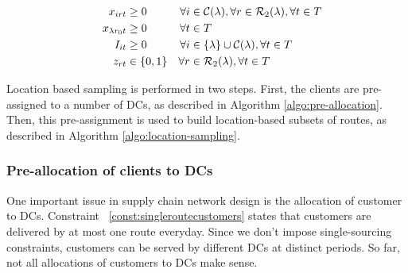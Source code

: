 \documentclass[a4paper,10pt]{article}
\begin{document}
\begin{linenumbers}
\begin{alignat}{3}
	&&x_{irt}			&\geq 0 							&\forall i&\in \mathcal{C}(\lambda), \forall r\in \mathcal{R}_2(\lambda),\forall t \in T\label{const:decomp_qpos}	\\
	&&x_{\lambda r_0 t}			&\geq 0 				&\forall t&\in T\label{const:decomp_qdcpos}	\\
	&&I_{it}	&\geq 0 			&\forall i &\in \{\lambda\}\cup \mathcal{C}(\lambda), \forall t\in T\label{const:decomp_invCpos}	\\
	&&z_{rt}		&\in \{0,1\} 	&\forall r&\in \mathcal{R}_2(\lambda), \forall t\in T\label{const:decomp_zbool}
\end{alignat}


Location based sampling is performed in two steps.
First, the clients are pre-assigned to a number of DCs, as described in Algorithm \ref{algo:pre-allocation}.
Then, this pre-assignment is used to build location-based subsets of routes, as described in Algorithm \ref{algo:location-sampling}.

\subsubsection{Pre-allocation of clients to DCs}

One important issue in supply chain network design is the allocation of customer to DCs. 
Constraint ~\eqref{const:singleroutecustomers} states that customers are delivered by at most one route everyday. 
Since we don't impose single-sourcing constraints, customers can be served by different DCs at distinct periods. 
So far, not all allocations of customers to DCs make sense. 


\end{linenumbers}
\end{document}
